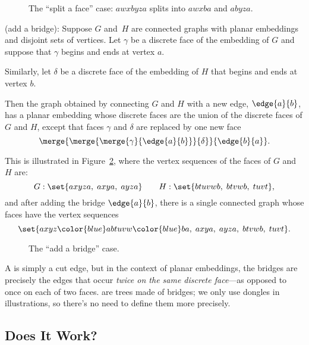 \begin{definition}
\begin{figure}


\caption{The ``split a face'' case: $awxbyza$ splits into $awxba$ and $abyza$.}
\label{fig:face-splitting}
\end{figure}

 (add a bridge): Suppose $G$ and~$H$
are connected graphs with planar embeddings and disjoint sets of
vertices.  Let $\gamma$ be a discrete face of the embedding of $G$ and
suppose that $\gamma$ begins and ends at vertex $a$.
\iffalse
That is, $\gamma$ is of the form
\[
a\dots a.
\]
\fi

Similarly, let $\delta$ be a discrete face of the embedding of $H$
that begins and ends at vertex $b$.
\iffalse
So $\delta$ is of the form
\[
b\cdots b.
\]
\fi

Then the graph obtained by connecting $G$ and $H$ with a new edge,
$\edge{a}{b}$, has a planar embedding whose discrete faces are the
union of the discrete faces of $G$ and $H$, except that faces $\gamma$
and $\delta$ are replaced by one new face
\[
\merge{\merge{\merge{\gamma}{\edge{a}{b}}}{\delta}}{\edge{b}{a}}.
\]

This is illustrated in Figure~\ref{fig:add-bridge}, where the vertex
sequences of the faces of $G$ and $H$ are:
\[
G: \set{ axyza,\; axya,\; ayza }
    \qquad H: \set{ btuvwb,\; btvwb,\; tuvt },
\]
and after adding the bridge $\edge{a}{b}$, there is a
single connected graph whose faces have the vertex sequences
\[
\set{ axyz{\color{blue}ab}tuvw{\color{blue}ba},\;
         axya,\; ayza,\; btvwb,\; tuvt }.
\]

\begin{figure}


\caption{The ``add a bridge'' case.}
\label{fig:add-bridge}
\end{figure}

\end{definition}

A  is simply a cut edge, but in the context of planar
embeddings, the bridges are precisely the edges that occur \emph{twice
  on the same discrete face}---as opposed to once on each of two
faces.   are trees made of bridges; we only use dongles
in illustrations, so there's no need to define them more precisely.

\subsection{Does It Work?}

